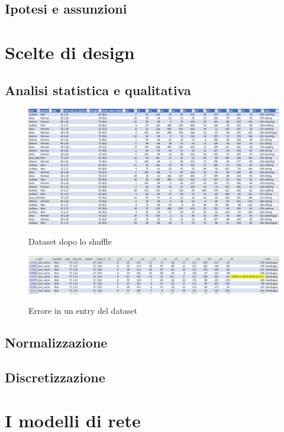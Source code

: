 \documentclass[12pt]{article}
\begin{document}
\subsection{Ipotesi e assunzioni}

\section{Scelte di design}
\subsection{Analisi statistica e qualitativa}

\begin{figure}[H]
	\centering
	{\includegraphics[width=1\textwidth]{images/dataset.JPG}}
	\caption{Dataset dopo lo shuffle}
	\label{fig:dataset}

\end{figure}
\begin{figure}[H]
	\centering
	{\includegraphics[width=1\textwidth]{images/dataset_error.JPG}}
	\caption{Errore in un entry del dataset}
	\label{fig:datasetError}
\end{figure}
\subsection{Normalizzazione}
\subsection{Discretizzazione}

\section{I modelli di rete}
\end{document}
